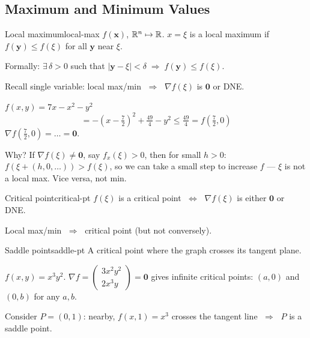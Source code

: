 \subsection{Maximum and Minimum Values}

\begin{definition}{Local maximum}{local-max}
  $f(\mathbf{x})$, $\mathbb{R}^{n}\mapsto\mathbb{R}$. \;
  $x=\xi$ is a local maximum if $f(\mathbf{y})\le f(\xi)$ for all $\mathbf{y}$ near $\xi$.

  Formally: $\exists\,\delta>0$ such that
  $\lvert\mathbf{y}-\xi\rvert<\delta \;\Longrightarrow\; f(\mathbf{y})\le f(\xi)$.
\end{definition}

Recall single variable: local max/min $\;\Longrightarrow\;$ $\nabla f(\xi)$ is $\mathbf{0}$ or DNE.

\begin{example}
  $f(x,y)=7x-x^{2}-y^{2}$
  \[
    = -(x-\tfrac{7}{2})^{2}+\tfrac{49}{4}-y^{2}
    \le \tfrac{49}{4} = f(\tfrac{7}{2},0)
  \]
  $\nabla f(\tfrac{7}{2},0) = \ldots = \mathbf{0}$.
\end{example}

Why? If $\nabla f(\xi)\neq\mathbf{0}$, say $f_{x}(\xi)>0$, then
for small $h>0$: $f(\xi+(h,0,\ldots))>f(\xi)$,
so we can take a small step to increase $f$ — $\xi$ is not a local max.
Vice versa, not min.

\begin{definition}{Critical point}{critical-pt}
  $f(\xi)$ is a critical point $\;\Longleftrightarrow\;$ $\nabla f(\xi)$
  is either $\mathbf{0}$ or DNE.

  Local max/min $\;\Longrightarrow\;$ critical point (but not conversely).
\end{definition}

\begin{definition}{Saddle point}{saddle-pt}
  A critical point where the graph crosses its tangent plane.
\end{definition}

\begin{example}
  $f(x,y)=x^{3}y^{2}$. \;
  $\nabla f=
    \begin{pmatrix}
      3x^{2}y^{2} \\2x^{3}y
    \end{pmatrix}
    =\mathbf{0}$
  gives infinite critical points: $(a,0)$ and $(0,b)$ for any $a,b$.

  Consider $P=(0,1)$: nearby, $f(x,1)=x^{3}$ crosses the tangent line
  $\;\Longrightarrow\;$ $P$ is a saddle point.
\end{example}

